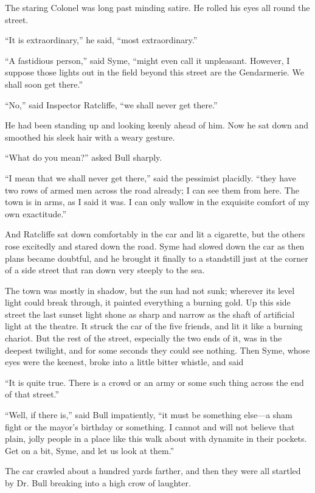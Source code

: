 \documentclass{book}
\begin{document}
The staring Colonel was long past minding satire. He rolled his eyes all round the street.

“It is extraordinary,” he said, “most extraordinary.”

“A fastidious person,” said Syme, “might even call it unpleasant. However, I suppose those lights out in the field beyond this street are the Gendarmerie. We shall soon get there.”

“No,” said Inspector Ratcliffe, “we shall never get there.”

He had been standing up and looking keenly ahead of him. Now he sat down and smoothed his sleek hair with a weary gesture.

“What do you mean?” asked Bull sharply.

“I mean that we shall never get there,” said the pessimist placidly. “they have two rows of armed men across the road already; I can see them from here. The town is in arms, as I said it was. I can only wallow in the exquisite comfort of my own exactitude.”

And Ratcliffe sat down comfortably in the car and lit a cigarette, but the others rose excitedly and stared down the road. Syme had slowed down the car as then plans became doubtful, and he brought it finally to a standstill just at the corner of a side street that ran down very steeply to the sea.

The town was mostly in shadow, but the sun had not sunk; wherever its level light could break through, it painted everything a burning gold. Up this side street the last sunset light shone as sharp and narrow as the shaft of artificial light at the theatre. It struck the car of the five friends, and lit it like a burning chariot. But the rest of the street, especially the two ends of it, was in the deepest twilight, and for some seconds they could see nothing. Then Syme, whose eyes were the keenest, broke into a little bitter whistle, and said

“It is quite true. There is a crowd or an army or some such thing across the end of that street.”

“Well, if there is,” said Bull impatiently, “it must be something else—a sham fight or the mayor’s birthday or something. I cannot and will not believe that plain, jolly people in a place like this walk about with dynamite in their pockets. Get on a bit, Syme, and let us look at them.”

The car crawled about a hundred yards farther, and then they were all startled by Dr. Bull breaking into a high crow of laughter.
\end{document}
